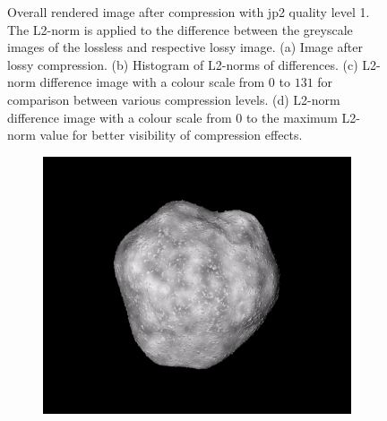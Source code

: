 \begin{figure}[htb]
\begin{subfigure}[b]{0.48\textwidth}
        \caption{}
        \label{fig:img_quality_comp_jp2_1_diff_rel}
    \end{subfigure}
    \caption{Overall rendered image after compression with \gls{jp2} quality level 1. The L2-norm is applied to the difference between the greyscale images of the lossless and respective lossy image. (a) Image after lossy compression. (b) Histogram of L2-norms of differences. (c) L2-norm difference image with a colour scale from $0$ to $131$ for comparison between various compression levels. (d) L2-norm difference image with a colour scale from $0$ to the maximum L2-norm value for better visibility of compression effects.}
    \label{fig:img_quality_comp_jp2_1}
\end{figure}


\begin{figure}[htb]
    \centering
    \begin{subfigure}[b]{0.48\textwidth}
        \centering
        \includegraphics[width=\textwidth]{doc/thesis/0_figures/compare_quality/set1/jp2_5.png}
        \caption{}
        \label{fig:img_quality_comp_jp2_5_orig}
    \end{subfigure}
    \begin{subfigure}[b]{0.48\textwidth}
        \centering

\end{subfigure}
\end{figure}

